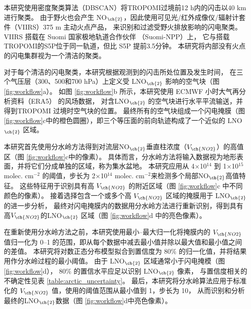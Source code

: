 本研究使用密度聚类算法（DBSCAN）将TROPOMI过境前12 h内\citep{Allen.2021a}的闪击以40 km进行聚类\citep{backlund2011density,Schubert.2017}。
由于野火也会产生 NO$_{\ch{2}}$，因此使用可见光/红外成像仪/辐射计套件（VIIRS）375 m 主动火点产品，
来识别和过滤受野火排放影响的闪电聚类。
VIIRS 搭载在 Suomi 国家极地轨道合作伙伴 （Suomi-NPP）上，
它与搭载TROPOMI的S5P位于同一轨道，但比 S5P 提前3.5分钟。
本研究将内部没有火点的闪电集群视为一个清洁的聚类。

对于每个清洁的闪电聚类，本研究根据观测到的闪击所处位置及发生时间，
在三个气压层（300、500和700 hPa）上定义受 LNO$_{\ch{2}}$ 影响的空气块（图 \ref{fig:workflow}a）。
如图 \ref{fig:workflow}b 所示，本研究使用 ECMWF 小时大气再分析资料（ERA5） 的风场数据\citep{Hersbach.2020}，
对含LNO$_{\ch{2}}$ 的空气块进行水平平流输送，并得到TROPOMI 过境时空气块的位置。
最终所有的空气块组成一个闪电掩膜（图 \ref{fig:workflow}c中的橙色圆圈），即三个等压面的前向轨迹构成了一个近似的 LNO$_{\ch{2}}$ 区域。

本研究首先使用分水岭方法得到对流层NO$_{\ch{2}}$垂直柱浓度（$V_{\ch{NO2}}$）的高值区（图 \ref{fig:workflow}c中的像素）。
具体而言，分水岭方法将输入数据视为地形表面，并将它们分成单独的区域，称为集水盆地\citep{Soille.1990,Heikenfeld.2019a}。
本研究应用从 4$\times$10$^{14}$ 到 1$\times$10$^{15}$ molec. cm$^{-2}$ 的阈值，步长为 2$\times$10$^{14}$ molec. cm$^{-2}$来检测多个局部NO$_{\ch{2}}$高值特征。
这些特征用于识别具有高 $V_{\ch{NO2}}$ 的附近区域（图 \ref{fig:workflow}c 中不同颜色的像素）。
接着选择包含一个或多个高 $V_{\ch{NO2}}$ 区域的掩膜用于 LNO$_{\ch{2}}$ 的进一步分析，
最终对闪电掩膜内的数据用分水岭方法进行重新识别，得到具有高$V_{\ch{NO2}}$的LNO$_{\ch{2}}$ 区域（图 \ref{fig:workflow}d 中的亮色像素）。

在重新使用分水岭方法之前，本研究使用最小--最大归一化将掩膜内的 $V_{\ch{NO2}}$ 值归一化为 0--1 的范围，即从每个数据中减去最小值并除以最大值和最小值之间的差值。
本研究将对数正态分布模型拟合到置信度为 80\% 的归一化值，并将结果用作分水岭过程的最小阈值。
由于 LNO$_{\ch{2}}$ 区域通常小于闪电掩模（图 \ref{fig:workflow}d），
80\% 的置信水平应足以识别 LNO$_{\ch{2}}$ 像素，
与置信度相关的不确定性见表 \ref{table:arctic_uncertainty}。
最后，本研究将分水岭算法应用于标准化的 $V_{\ch{NO2}}$ 值，使用的阈值范围从最小值到 1，步长为 10，
从而识别和分析最终的LNO$_{\ch{2}}$数据（图 \ref{fig:workflow}d中亮色像素）。


